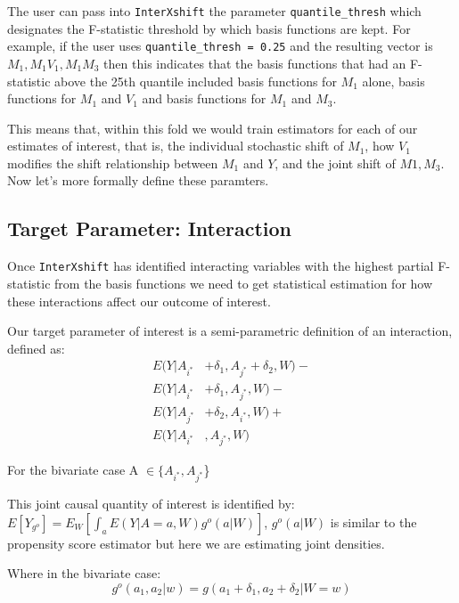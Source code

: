 \documentclass[
]{article}
\begin{document}
The user can pass into \texttt{InterXshift} the parameter
\texttt{quantile\_thresh} which designates the F-statistic threshold by
which basis functions are kept. For example, if the user uses
\texttt{quantile\_thresh\ =\ 0.25} and the resulting vector is
\(M_1, M_1V_1, M_1M_3\) then this indicates that the basis functions
that had an F-statistic above the 25th quantile included basis functions
for \(M_1\) alone, basis functions for \(M_1\) and \(V_1\) and basis
functions for \(M_1\) and \(M_3\).

This means that, within this fold we would train estimators for each of
our estimates of interest, that is, the individual stochastic shift of
\(M_1\), how \(V_1\) modifies the shift relationship between \(M_1\) and
\(Y\), and the joint shift of \(M1,M_3\). Now let's more formally define
these paramters.

\hypertarget{target-parameter-interaction}{%
\subsection{Target Parameter:
Interaction}\label{target-parameter-interaction}}

Once \texttt{InterXshift} has identified interacting variables with the
highest partial F-statistic from the basis functions we need to get
statistical estimation for how these interactions affect our outcome of
interest.

Our target parameter of interest is a semi-parametric definition of an
interaction, defined as: \begin{equation} \label{eq1}
\begin{split}
E(Y|A_{i^*} &+ \delta_1, A_{j^*} + \delta_2, W) - \\ 
E(Y|A_{i^*} &+ \delta_1, A_{j^*}, W) - \\ 
E(Y|A_{j^*} &+ \delta_2,  A_{i^*}, W) + \\
E(Y|A_{i^*}&, A_{j^*}, W) 
\end{split}
\end{equation}

For the bivariate case A \(\in \{A_{i^*}, A_{j^*}\)\}

This joint causal quantity of interest is identified by:
\(E[Y_{g^o}] = E_W [\int_a E(Y|A=a, W)g^o(a|W)]\), \(g^o(a|W)\) is
similar to the propensity score estimator but here we are estimating
joint densities.

Where in the bivariate case:
\[g^o(a_1, a_2|w) = g(a_1 + \delta_1, a_2 + \delta_2|W = w)\]
\end{document}
